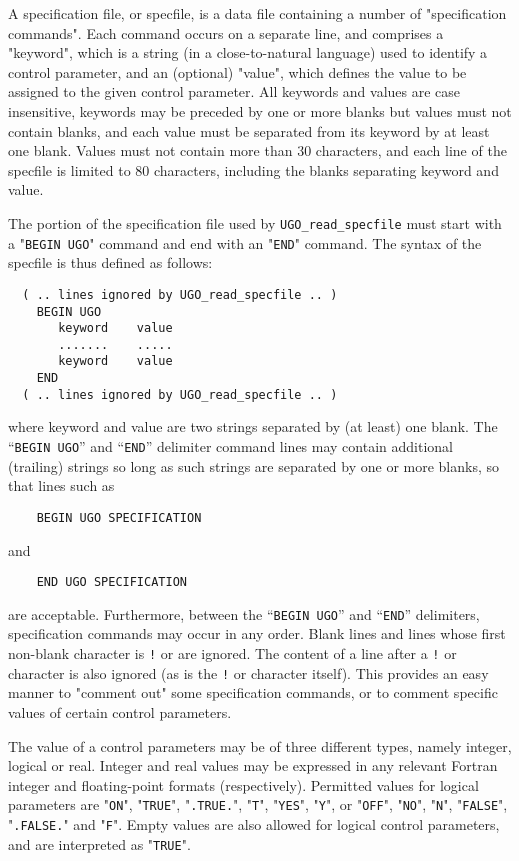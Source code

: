\documentclass{galahad}
\newcommand{\packagename}{UGO}
\begin{document}
A specification file, or specfile, is a data file containing a number of
"specification commands". Each command occurs on a separate line,
and comprises a "keyword",
which is a string (in a close-to-natural language) used to identify a
control parameter, and
an (optional) "value", which defines the value to be assigned to the given
control parameter. All keywords and values are case insensitive,
keywords may be preceded by one or more blanks but
values must not contain blanks, and
each value must be separated from its keyword by at least one blank.
Values must not contain more than 30 characters, and
each line of the specfile is limited to 80 characters,
including the blanks separating keyword and value.

The portion of the specification file used by
{\tt \packagename\_read\_specfile}
must start
with a "{\tt BEGIN \packagename}" command and end with an
"{\tt END}" command.  The syntax of the specfile is thus defined as follows:
\begin{verbatim}
  ( .. lines ignored by UGO_read_specfile .. )
    BEGIN UGO
       keyword    value
       .......    .....
       keyword    value
    END
  ( .. lines ignored by UGO_read_specfile .. )
\end{verbatim}
where keyword and value are two strings separated by (at least) one blank.
The ``{\tt BEGIN \packagename}'' and ``{\tt END}'' delimiter command lines
may contain additional (trailing) strings so long as such strings are
separated by one or more blanks, so that lines such as
\begin{verbatim}
    BEGIN UGO SPECIFICATION
\end{verbatim}
and
\begin{verbatim}
    END UGO SPECIFICATION
\end{verbatim}
are acceptable. Furthermore,
between the
``{\tt BEGIN \packagename}'' and ``{\tt END}'' delimiters,
specification commands may occur in any order.  Blank lines and
lines whose first non-blank character is {\tt !} or {\tt *} are ignored.
The content
of a line after a {\tt !} or {\tt *} character is also
ignored (as is the {\tt !} or {\tt *}
character itself). This provides an easy manner to "comment out" some
specification commands, or to comment specific values
of certain control parameters.

The value of a control parameters may be of three different types, namely
integer, logical or real.
Integer and real values may be expressed in any relevant Fortran integer and
floating-point formats (respectively). Permitted values for logical
parameters are "{\tt ON}", "{\tt TRUE}", "{\tt .TRUE.}", "{\tt T}",
"{\tt YES}", "{\tt Y}", or "{\tt OFF}", "{\tt NO}",
"{\tt N}", "{\tt FALSE}", "{\tt .FALSE.}" and "{\tt F}".
Empty values are also allowed for
logical control parameters, and are interpreted as "{\tt TRUE}".
\end{document}
